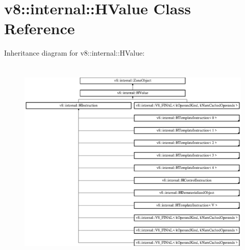 \hypertarget{classv8_1_1internal_1_1_h_value}{}\section{v8\+:\+:internal\+:\+:H\+Value Class Reference}
\label{classv8_1_1internal_1_1_h_value}
Inheritance diagram for v8\+:\+:internal\+:\+:H\+Value\+:\begin{figure}[H]
\begin{center}
\leavevmode
\includegraphics[height=10.000000cm]{classv8_1_1internal_1_1_h_value}
\end{center}
\end{figure}
